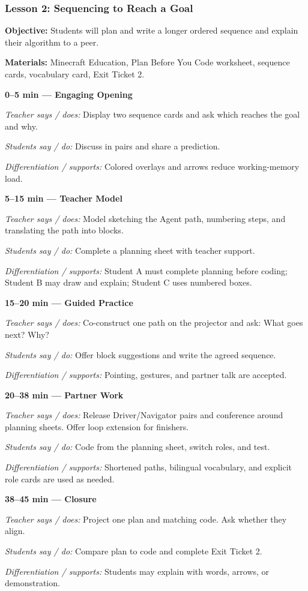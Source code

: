 \documentclass[12pt]{article}
\newcommand{\lessonphase}[5]{%
\noindent\textbf{\color{brickRed}#1 --- #2}\par
\textit{Teacher says / does:} #3\par
\textit{Students say / do:} #4\par
\textit{Differentiation / supports:} #5\par\medskip
}
\begin{document}
\subsubsection*{Lesson 2: Sequencing to Reach a Goal}
\textbf{Objective:} Students will plan and write a longer ordered sequence and explain their algorithm to a peer.\par
\textbf{Materials:} Minecraft Education, Plan Before You Code worksheet, sequence cards, vocabulary card, Exit Ticket 2.\par
\begin{designbox}
\lessonphase{0--5 min}{Engaging Opening}{Display two sequence cards and ask which reaches the goal and why.}{Discuss in pairs and share a prediction.}{Colored overlays and arrows reduce working-memory load.}
\lessonphase{5--15 min}{Teacher Model}{Model sketching the Agent path, numbering steps, and translating the path into blocks.}{Complete a planning sheet with teacher support.}{Student A must complete planning before coding; Student B may draw and explain; Student C uses numbered boxes.}
\lessonphase{15--20 min}{Guided Practice}{Co-construct one path on the projector and ask: What goes next? Why?}{Offer block suggestions and write the agreed sequence.}{Pointing, gestures, and partner talk are accepted.}
\lessonphase{20--38 min}{Partner Work}{Release Driver/Navigator pairs and conference around planning sheets. Offer loop extension for finishers.}{Code from the planning sheet, switch roles, and test.}{Shortened paths, bilingual vocabulary, and explicit role cards are used as needed.}
\lessonphase{38--45 min}{Closure}{Project one plan and matching code. Ask whether they align.}{Compare plan to code and complete Exit Ticket 2.}{Students may explain with words, arrows, or demonstration.}
\end{designbox}
\end{document}
